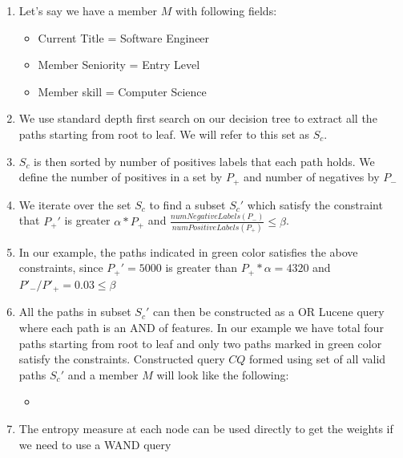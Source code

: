 \begin{enumerate}
    \item Let's say we have a member $M$ with following fields:
    \begin{itemize}
    \item Current Title = Software Engineer
    \item Member Seniority = Entry Level
    \item Member skill = Computer Science
    \end{itemize}
    \item We use standard depth first search on our decision tree to extract all the paths starting from root to leaf. We will refer to this set as $S_c$.
    \item $S_c$ is then sorted by number of positives labels that each path holds. We define the number of positives in a set by $P_+$ and number of negatives by $P_-$
    \item We iterate over the set $S_c$ to find a subset $S_c'$ which satisfy the constraint that $P_+'$ is greater $\alpha * P_+$ and $\frac{numNegativeLabels(P_{-})}{numPositiveLabels(P_{+})} \leq \beta$. 
    \item In our example, the paths indicated in green color satisfies the above constraints, since $P_+'= 5000$  is greater than $P_+ * \alpha = 4320$ and  $P'_-/P'_+ = 0.03 \leq \beta$
    \item All the paths in subset $S_c'$ can then be constructed as a OR Lucene query~\cite{mccandless2010lucene} where each path is an AND of features. In our example we have total four paths starting from root to leaf and only two paths marked in green color satisfy the constraints. Constructed query $CQ$ formed  using set of all valid paths $S_c'$ and  a member $M$ will look like the following: 
    \begin{itemize}
    \item {}
    \end{itemize}
    \item The entropy measure at each node can be used directly to get the
        weights if we need to use a WAND query
    
\end{enumerate}

